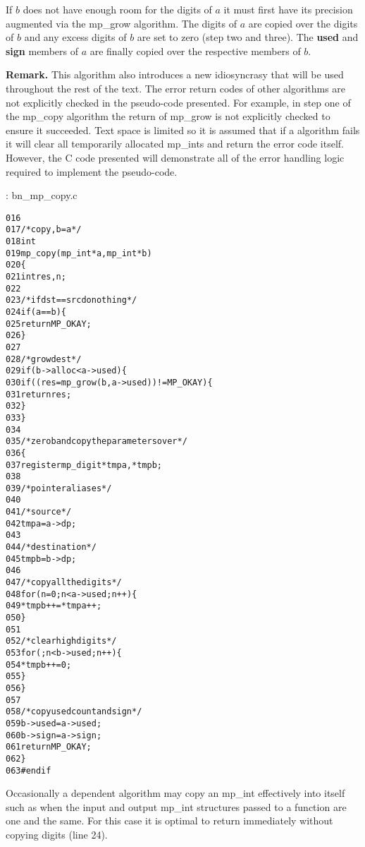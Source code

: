 \documentclass[b5paper]{book}
\begin{document}
If $b$ does not have enough room for the digits of $a$ it must first have its precision augmented via the mp\_grow 
algorithm.  The digits of $a$ are copied over the digits of $b$ and any excess digits of $b$ are set to zero (step two
and three).  The \textbf{used} and \textbf{sign} members of $a$ are finally copied over the respective members of
$b$.

\textbf{Remark.}  This algorithm also introduces a new idiosyncrasy that will be used throughout the rest of the
text.  The error return codes of other algorithms are not explicitly checked in the pseudo-code presented.  For example, in 
step one of the mp\_copy algorithm the return of mp\_grow is not explicitly checked to ensure it succeeded.  Text space is 
limited so it is assumed that if a algorithm fails it will clear all temporarily allocated mp\_ints and return
the error code itself.  However, the C code presented will demonstrate all of the error handling logic required to 
implement the pseudo-code.

\vspace{+3mm}\begin{small}
\hspace{-5.1mm}{\bf File}: bn\_mp\_copy.c
\vspace{-3mm}
\begin{alltt}
016   
017   /* copy, b = a */
018   int
019   mp_copy (mp_int * a, mp_int * b)
020   \{
021     int     res, n;
022   
023     /* if dst == src do nothing */
024     if (a == b) \{
025       return MP_OKAY;
026     \}
027   
028     /* grow dest */
029     if (b->alloc < a->used) \{
030        if ((res = mp_grow (b, a->used)) != MP_OKAY) \{
031           return res;
032        \}
033     \}
034   
035     /* zero b and copy the parameters over */
036     \{
037       register mp_digit *tmpa, *tmpb;
038   
039       /* pointer aliases */
040   
041       /* source */
042       tmpa = a->dp;
043   
044       /* destination */
045       tmpb = b->dp;
046   
047       /* copy all the digits */
048       for (n = 0; n < a->used; n++) \{
049         *tmpb++ = *tmpa++;
050       \}
051   
052       /* clear high digits */
053       for (; n < b->used; n++) \{
054         *tmpb++ = 0;
055       \}
056     \}
057   
058     /* copy used count and sign */
059     b->used = a->used;
060     b->sign = a->sign;
061     return MP_OKAY;
062   \}
063   #endif
\end{alltt}
\end{small}

Occasionally a dependent algorithm may copy an mp\_int effectively into itself such as when the input and output
mp\_int structures passed to a function are one and the same.  For this case it is optimal to return immediately without 
copying digits (line 24).  
\end{document}
